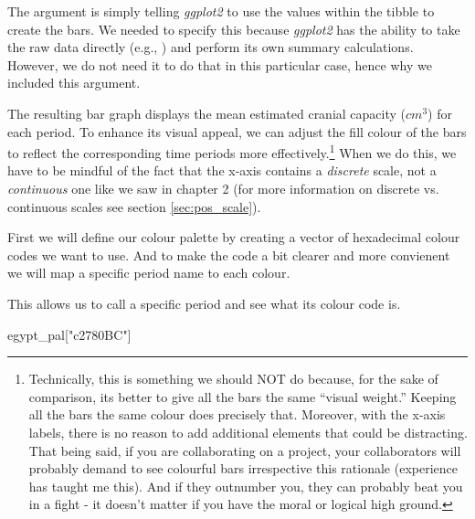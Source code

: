 The argument  is simply telling \textit{ggplot2} to use the values within the  tibble to create the bars.  We needed to specify this because \textit{ggplot2} has the ability to take the raw data directly (e.g., ) and perform its own summary calculations. However, we do not need it to do that in this particular case, hence why we included this argument.

The resulting bar graph displays the mean estimated cranial capacity ($cm^3$) for each period. To enhance its visual appeal, we can adjust the fill colour of the bars to reflect the corresponding time periods more effectively.\footnote{Technically, this is something we should NOT do because, for the sake of comparison, its better to give all the bars the same ``visual weight.'' Keeping all the bars the same colour does precisely that. Moreover, with the x-axis labels, there is no reason to add additional elements that could be distracting. That being said, if you are collaborating on a project, your collaborators will probably demand to see colourful bars irrespective this rationale (experience has taught me this). And if they outnumber you, they can probably beat you in a fight - it doesn't matter if you have the moral or logical high ground.} When we do this, we have to be mindful of the fact that the x-axis contains a \textit{discrete} scale, not a \textit{continuous} one like we saw in chapter 2 (for more information on discrete vs. continuous scales see section \ref{sec:pos_scale}).

First we will define our colour palette by creating a vector of hexadecimal colour codes we want to use. And to make the code a bit clearer and more convienent we will map a specific period name to each colour.


\vspace{1em}
\noindent
This allows us to call a specific period and see what its colour code is.

\begin{inR}
egypt_pal["c2780BC"]
\end{inR}



